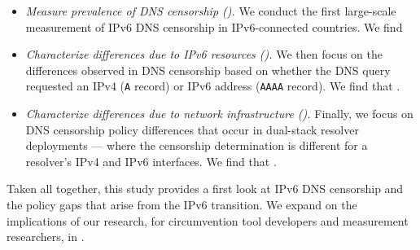 \begin{itemize}


  \item {\it Measure prevalence of DNS censorship ().} 
    We conduct the first large-scale measurement of IPv6 DNS censorship in
     IPv6-connected countries. We find 

  \item {\it Characterize differences due to IPv6 resources
    ().} 
    We then focus on the differences observed in DNS censorship based on
    whether the DNS query requested an IPv4 ({\tt A} record) or IPv6 address
    ({\tt AAAA} record). We find that .

  \item {\it Characterize differences due to network infrastructure
    ().}
    Finally, we focus on DNS censorship policy differences that occur in
    dual-stack resolver deployments --- \ie where the censorship determination
    is different for a resolver's IPv4 and IPv6 interfaces. We find that
    .

\end{itemize}

Taken all together, this study provides a first look at IPv6 DNS censorship and
the policy gaps that arise from the IPv6 transition. We expand on the
implications of our research, for circumvention tool developers and measurement
researchers, in .
